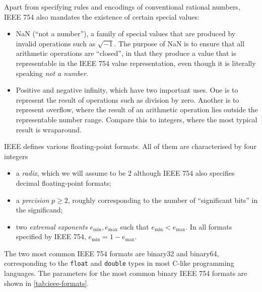 Apart from specifying rules and encodings of conventional rational
numbers, IEEE 754 also mandates the existence of certain special
values:

\begin{itemize}
\item NaN (``not a number''), a family of special values that are
  produced by invalid operations such as $\sqrt{-1}$.  The purpose of
  NaN is to ensure that all arithmetic operations are ``closed'', in
  that they produce a value that is representable in the IEEE 754
  value representation, even though it is literally speaking \emph{not
    a number}.
\item Positive and negative infinity, which have two important uses.
  One is to represent the result of operations such as division by
  zero.  Another is to represent overflow, where the result of an
  arithmetic operation lies outside the representable number range.
  Compare this to integers, where the most typical result is
  wraparound.
\end{itemize}

IEEE defines various floating-point formats.  All of them are
characterised by four integers

\begin{itemize}
\item a \emph{radix}, which we will assume to be 2 although IEEE 754
  also specifies decimal floating-point formats;
\item a \emph{precision} $p \geq 2$, roughly corresponding to the
  number of ``significant bits'' in the significand;
\item two \emph{extremal exponents} $e_{\text{min}},e_{\text{max}}$
  such that $e_{\text{min}} < e_{\text{max}}$.  In all formats
  specified by IEEE 754, $e_{\text{min}}=1-e_{\text{max}}$.
\end{itemize}

The two most common IEEE 754 formats are binary32 and binary64,
corresponding to the \texttt{float} and \texttt{double} types in most
C-like programming languages.  The parameters for the most common
binary IEEE 754 formats are shown in \cref{tab:ieee-formats}.

